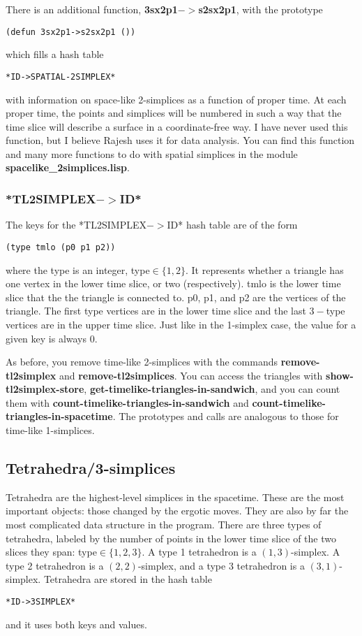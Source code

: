 \documentclass[12pt]{article}
\begin{document}
There is an additional function, \textbf{3sx2p1$->$s2sx2p1}, with the
prototype
\begin{lstlisting}
(defun 3sx2p1->s2sx2p1 ())
\end{lstlisting}
which fills a hash table
\begin{lstlisting}
*ID->SPATIAL-2SIMPLEX*
\end{lstlisting}
with information on space-like 2-simplices as a function of proper
time. At each proper time, the points and simplices will be numbered
in such a way that the time slice will describe a surface in a
coordinate-free way. I have never used this function, but I believe
Rajesh uses it for data analysis. You can find this function and many
more functions to do with spatial simplices in the module
\textbf{spacelike\_2simplices.lisp}.


\subsubsection{*TL2SIMPLEX$->$ID*}
The keys for the *TL2SIMPLEX$->$ID* hash table are of the form
\begin{lstlisting}
(type tmlo (p0 p1 p2))
\end{lstlisting}
where the type is an integer, type$\in\{1,2\}$. It represents whether
a triangle has one vertex in the lower time slice, or two
(respectively). tmlo is the lower time slice that the the triangle is
connected to. p0, p1, and p2 are the vertices of the triangle. The
first type vertices are in the lower time slice and the last $3-$type
vertices are in the upper time slice. Just like in the 1-simplex case,
the value for a given key is always 0.

As before, you remove time-like 2-simplices with the commands
\textbf{remove-tl2simplex} and \textbf{remove-tl2simplices}. You can
access the triangles with \textbf{show-tl2simplex-store},
\textbf{get-timelike-triangles-in-sandwich}, and you can count them
with \textbf{count-timelike-triangles-in-sandwich} and
\textbf{count-timelike-triangles-in-spacetime}. The prototypes and
calls are analogous to those for time-like 1-simplices.

\subsection{Tetrahedra/3-simplices}
Tetrahedra are the highest-level simplices in the spacetime. These are
the most important objects: those changed by the ergotic moves. They
are also by far the most complicated data structure in the
program. There are three types of tetrahedra, labeled by the number of
points in the lower time slice of the two slices they span:
type$\in\{1,2,3\}$. A type 1 tetrahedron is a $(1,3)$-simplex. A type
2 tetrahedron is a $(2,2)$-simplex, and a type 3 tetrahedron is a
$(3,1)$-simplex. Tetrahedra are stored in the hash table
\begin{lstlisting}
*ID->3SIMPLEX*
\end{lstlisting}
and it uses both keys and values.
\end{document}

